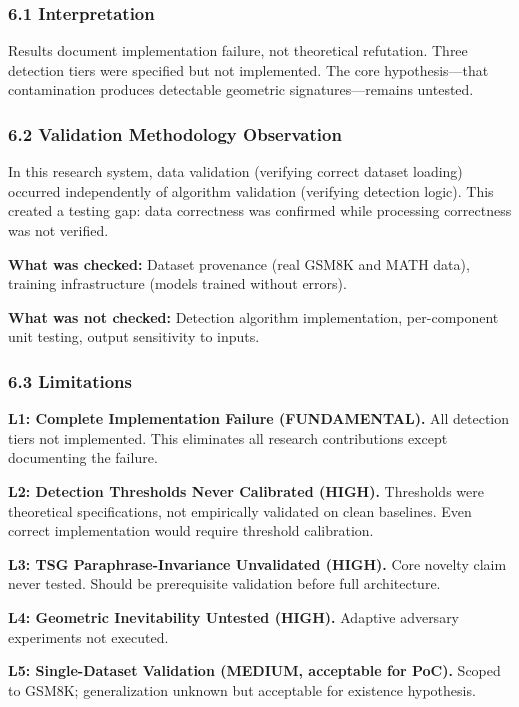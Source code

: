 
\subsubsection{6.1 Interpretation}

Results document implementation failure, not theoretical refutation. Three detection tiers were specified but not implemented. The core hypothesis—that contamination produces detectable geometric signatures—remains untested.

\subsubsection{6.2 Validation Methodology Observation}

In this research system, data validation (verifying correct dataset loading) occurred independently of algorithm validation (verifying detection logic). This created a testing gap: data correctness was confirmed while processing correctness was not verified.

\textbf{What was checked:} Dataset provenance (real GSM8K and MATH data), training infrastructure (models trained without errors).

\textbf{What was not checked:} Detection algorithm implementation, per-component unit testing, output sensitivity to inputs.

\subsubsection{6.3 Limitations}

\textbf{L1: Complete Implementation Failure (FUNDAMENTAL).} All detection tiers not implemented. This eliminates all research contributions except documenting the failure.

\textbf{L2: Detection Thresholds Never Calibrated (HIGH).} Thresholds were theoretical specifications, not empirically validated on clean baselines. Even correct implementation would require threshold calibration.

\textbf{L3: TSG Paraphrase-Invariance Unvalidated (HIGH).} Core novelty claim never tested. Should be prerequisite validation before full architecture.

\textbf{L4: Geometric Inevitability Untested (HIGH).} Adaptive adversary experiments not executed.

\textbf{L5: Single-Dataset Validation (MEDIUM, acceptable for PoC).} Scoped to GSM8K; generalization unknown but acceptable for existence hypothesis.

